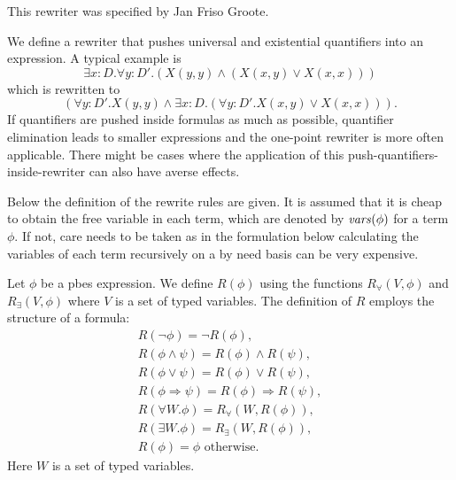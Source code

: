 This rewriter was specified by Jan Friso Groote.

We define a rewriter that pushes universal and existential quantifiers into an
expression. A typical example is \[\exists x{:}D.\forall y{:}D'.(X(y,y)\wedge (X(x,y)\vee X(x,x)))\]
which is rewritten to
\[(\forall y{:}D'.X(y,y)\wedge \exists x{:}D.(\forall y{:}D'.X(x,y)\vee X(x,x))).\]
If quantifiers are pushed inside formulas as much as possible, quantifier elimination leads to smaller
expressions and the one-point rewriter is more often applicable. There might be cases where the
application of this push-quantifiers-inside-rewriter can also have averse effects.

Below the definition of the rewrite rules are given. It is assumed that it is cheap to obtain the
free variable in each term, which are denoted by $\vars(\phi)$ for a term $\phi$.
If not, care needs to be taken as in the formulation below calculating the
variables of each term recursively on a by need basis can be very expensive.

Let $\phi$ be a pbes expression. We
define $R(\phi)$ using the functions $R_{\forall}(V,\phi)$ and
$R_{\exists}(V,\phi)$ where $V$ is a set of typed variables. The
definition of $R$ employs the structure of a formula:
\[\begin{array}{l}
R(\neg \phi)=\neg R(\phi),\\
R(\phi\wedge \psi)=R(\phi)\wedge R(\psi),\\
R(\phi\vee\psi)=R(\phi)\vee R(\psi),\\
R(\phi\Rightarrow\psi)=R(\phi)\Rightarrow R(\psi),\\
R(\forall W.\phi)=R_{\forall}(W,R(\phi)),\\
R(\exists W.\phi)=R_{\exists}(W,R(\phi)),\\
R(\phi)=\phi\textrm{  otherwise}.
\end{array}
\]
Here $W$ is a set of typed variables.

